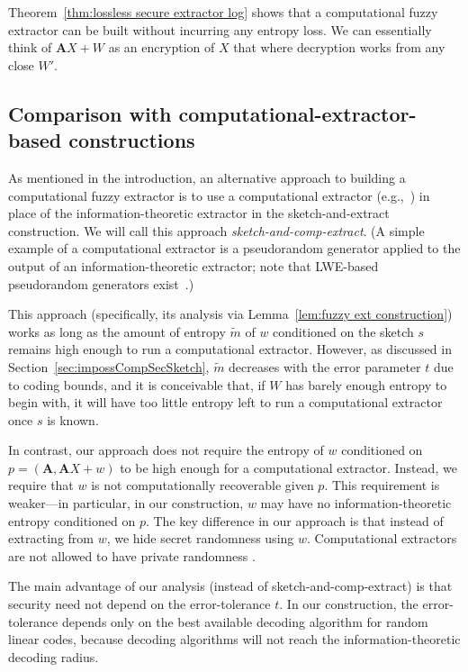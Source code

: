\documentclass{llncs}
\newcommand{\secref}[1]{\mbox{Section~\ref{#1}}}
\newcommand{\thref}[1]{\mbox{Theorem~\ref{#1}}}
\newcommand{\lemref}[1]{\mbox{Lemma~\ref{#1}}}
\newcommand{\vect}[1]{\ensuremath{\mathbf{#1}}}
\newcommand{\vA}{\vect{A}}
\begin{document}
\thref{thm:lossless secure extractor log} shows that a computational fuzzy extractor can be built without incurring any entropy loss.  We can essentially think of $\vA X+W$ as an encryption of $X$ that where decryption works from any close $W'$.

\subsection{Comparison with computational-extractor-based constructions}
\label{sec:prg based comparison}
As mentioned in the introduction, an alternative approach to building a computational fuzzy extractor is to use  a computational extractor (e.g.,~\cite{krawczyk2010cryptographic,barak2011leftover,dachman2012computational}) in place of the information-theoretic extractor in the sketch-and-extract construction.  We will call this approach \emph{sketch-and-comp-extract}.  (A simple example of a computational extractor is a pseudorandom generator applied to the output of an information-theoretic extractor; note that LWE-based pseudorandom generators exist~\cite{applebaum2006pseudorandom}.)

This approach (specifically, its analysis via \lemref{lem:fuzzy ext construction}) works as long as the amount of entropy $\tilde{m}$ of $w$ conditioned on the sketch $s$ remains high enough to run a computational extractor.  However, as discussed in \secref{sec:impossCompSecSketch}, $\tilde{m}$ decreases with the error parameter $t$ due to coding bounds, and it is conceivable that, if $W$ has  barely enough entropy to begin with, it will have too little entropy left to run a computational extractor once $s$ is known.

In contrast, our approach does not require the entropy of $w$ conditioned on $p=(\vA, \vA X+w)$ to  be high enough for a computational extractor. Instead, we require that $w$ is not computationally recoverable  given $p$.  This requirement is weaker---in particular, in our construction, $w$ may have no information-theoretic entropy conditioned on $p$.  The key difference in our approach is that instead of extracting from $w$, we hide secret randomness using $w$. Computational extractors are not allowed to have private randomness \cite[Definition 3]{krawczyk2010cryptographic}.

The main advantage of our analysis (instead of sketch-and-comp-extract) is that security need not depend on the error-tolerance $t$.  In our construction, the error-tolerance depends only on the best available decoding algorithm for random linear codes, because decoding algorithms will not reach the information-theoretic decoding radius.
\end{document}
